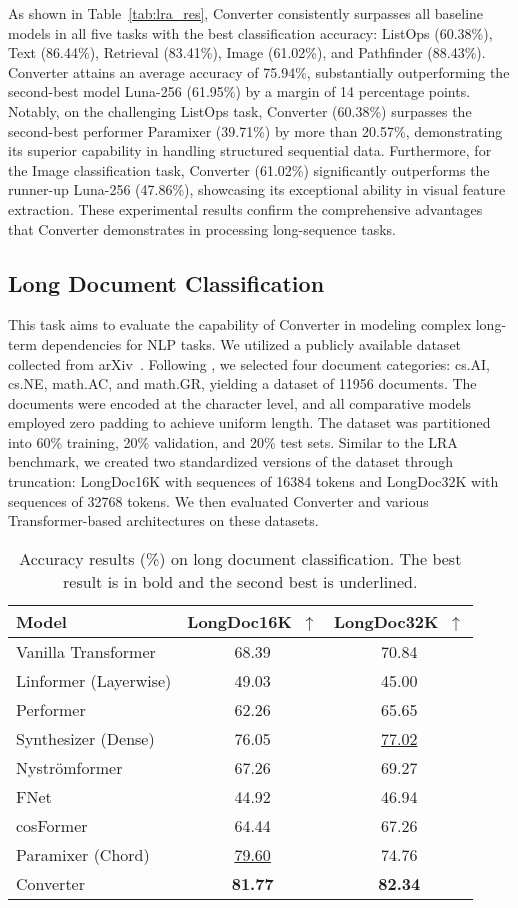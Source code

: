 As shown in Table~\ref{tab:lra_res}, Converter consistently surpasses all baseline models in all five tasks with the best classification accuracy: ListOps (60.38\%), Text (86.44\%), Retrieval (83.41\%), Image (61.02\%), and Pathfinder (88.43\%). Converter attains an average accuracy of 75.94\%, substantially outperforming the second-best model Luna-256 (61.95\%) by a margin of 14 percentage points. Notably, on the challenging ListOps task, Converter (60.38\%) surpasses the second-best performer Paramixer (39.71\%) by more than 20.57\%, demonstrating its superior capability in handling structured sequential data. Furthermore, for the Image classification task, Converter (61.02\%) significantly outperforms the runner-up Luna-256 (47.86\%), showcasing its exceptional ability in visual feature extraction. These experimental results confirm the comprehensive advantages that Converter demonstrates in processing long-sequence tasks.

\subsection{Long Document Classification}
This task aims to evaluate the capability of Converter in modeling complex long-term dependencies for NLP tasks. We utilized a publicly available dataset collected from arXiv~\citep{a11080109}. Following \citet{9878955}, we selected four document categories: cs.AI, cs.NE, math.AC, and math.GR, yielding a dataset of 11956 documents. The documents were encoded at the character level, and all comparative models employed zero padding to achieve uniform length. The dataset was partitioned into 60\% training, 20\% validation, and 20\% test sets. Similar to the LRA benchmark, we created two standardized versions of the dataset through truncation: LongDoc16K with sequences of 16384 tokens and LongDoc32K with sequences of 32768 tokens. We then evaluated Converter and various Transformer-based architectures on these datasets.

\begin{table}[!h]
\centering
\caption{Accuracy results (\%) on long document classification. The best result is in bold and the second best is underlined.}
\label{tab:longdoc}
\begin{tabular}{l|cc}
\toprule
\textbf{Model} & \textbf{LongDoc16K}~$\uparrow$ & \textbf{LongDoc32K}~$\uparrow$ \\
\midrule
Vanilla Transformer & 68.39 & 70.84 \\
Linformer (Layerwise) & 49.03 & 45.00 \\
Performer & 62.26 & 65.65 \\
Synthesizer (Dense) & 76.05 & \underline{77.02} \\
Nystr{\"{o}}mformer & 67.26 & 69.27 \\
FNet & 44.92 & 46.94 \\
cosFormer & 64.44 & 67.26 \\
Paramixer (Chord) & \underline{79.60} & 74.76 \\
\midrule
Converter & \textbf{81.77} & \textbf{82.34} \\
\bottomrule
\end{tabular}
\end{table}

